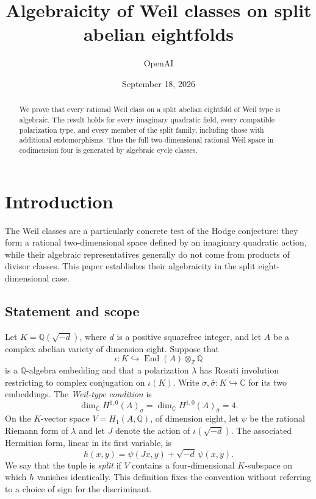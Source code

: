 \documentclass[11pt]{article}
\title{Algebraicity of Weil classes on split abelian eightfolds}
\author{OpenAI}
\date{September 18, 2026}
\theoremstyle{definition}
\theoremstyle{remark}
\newcommand{\Q}{\mathbb Q}
\newcommand{\C}{\mathbb C}
\newcommand{\Z}{\mathbb Z}
\DeclareMathOperator{\End}{End}
\numberwithin{equation}{section}
\begin{document}
\maketitle
\begin{abstract}
We prove that every rational Weil class on a split abelian eightfold of
Weil type is algebraic. The result holds for every imaginary quadratic
field, every compatible polarization type, and every member of the split
family, including those with additional endomorphisms. Thus the full
two-dimensional rational Weil space in codimension four is generated by
algebraic cycle classes.
\end{abstract}
\tableofcontents
\section{Introduction}
\label{intro:section}

The Weil classes are a particularly concrete test of the Hodge conjecture:
they form a rational two-dimensional space defined by an imaginary
quadratic action, while their algebraic representatives generally do not
come from products of divisor classes.  This paper establishes their
algebraicity in the split eight-dimensional case.

\subsection{Statement and scope}

Let $K=\Q(\sqrt{-d})$, where $d$ is a positive squarefree integer, and let
$A$ be a complex abelian variety of dimension eight.  Suppose that
\[
 \iota:K\hookrightarrow\End(A)\otimes_\Z\Q
\]
is a $\Q$-algebra embedding and that a polarization $\lambda$ has Rosati
involution restricting to complex conjugation on $\iota(K)$.  Write
$\sigma,\bar\sigma:K\hookrightarrow\C$ for its two embeddings.
The \emph{Weil-type condition} is
\[
 \dim_\C H^{1,0}(A)_\sigma=
 \dim_\C H^{1,0}(A)_{\bar\sigma}=4.
\]
On the $K$-vector space $V=H_1(A,\Q)$, of dimension eight, let $\psi$
be the rational Riemann form of $\lambda$ and let $J$ denote the action
of $\iota(\sqrt{-d})$.  The associated Hermitian form, linear in its first
variable, is
\begin{equation}
 h(x,y)=\psi(Jx,y)+\sqrt{-d}\,\psi(x,y).
 \label{intro:hermitian}
\end{equation}
We say that the tuple is \emph{split} if $V$ contains a four-dimensional
$K$-subspace on which $h$ vanishes identically.  This definition fixes the
convention without referring to a choice of sign for the discriminant.
\end{document}
